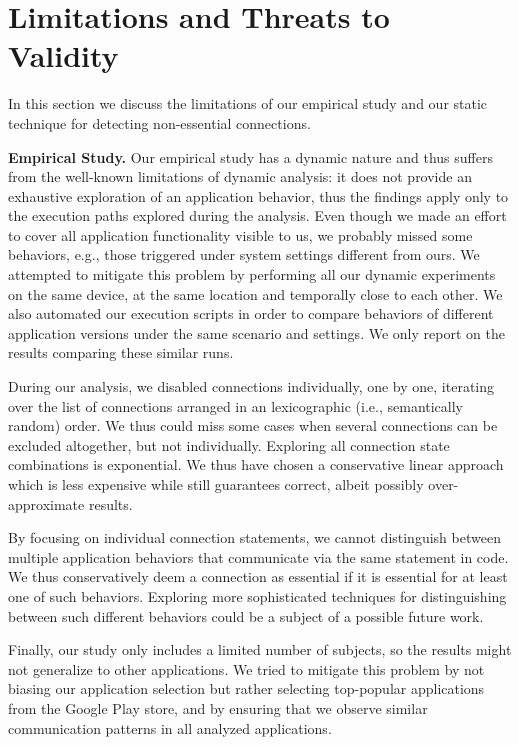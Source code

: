 \section{Limitations and Threats to \\Validity}
\label{sec:limitations}
In this section we discuss the limitations of our empirical study and our static technique for detecting non-essential connections.

\vspace{0.05in}
\noindent 
{\bf Empirical Study.}
Our empirical study has a dynamic nature and thus suffers from the well-known limitations of dynamic analysis: it does not provide an exhaustive exploration of an application behavior, thus the findings apply only to the execution paths explored during the analysis. 
Even though we made an effort to cover all application functionality visible to us, we probably missed some behaviors, e.g., those triggered under system settings different from ours. 
We attempted to mitigate this problem by performing all our dynamic experiments on the same device, at the same location and temporally close to each other.  
We also automated our execution scripts in order to compare behaviors of different application versions under the same scenario and settings. 
We only report on the results comparing these similar runs.  

During our analysis, we disabled connections individually, one by one, iterating over the list of connections arranged in an lexicographic (i.e., semantically random) order. We thus could miss some cases when 
several connections can be excluded altogether, but not individually. 
Exploring all connection state combinations is exponential. 
We thus have chosen a conservative linear approach which is less expensive while still guarantees correct, 
albeit possibly over-approximate results. 

By focusing on individual connection statements, we cannot distinguish between multiple application behaviors
that communicate via the same statement in code. We thus conservatively deem a connection as essential if it is essential for at least one of such behaviors. Exploring more sophisticated techniques for distinguishing between such different behaviors could be a subject of a possible future work.
 
Finally, our study only includes a limited number of subjects, so the results might not generalize to other applications.
We tried to mitigate this problem by not biasing our application selection but rather selecting top-popular applications from the Google Play store, and by ensuring that we observe similar communication patterns in all analyzed applications.


